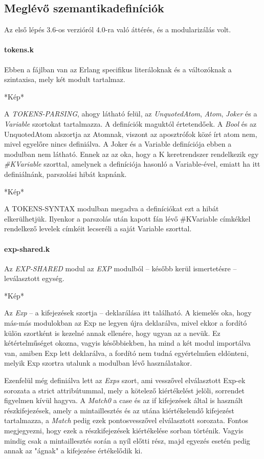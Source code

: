 \documentclass[twoside, a4paper, 12pt]{article}
\begin{document}
\subsection{Meglévő szemantikadefiníciók}
Az első lépés 3.6-os verzióról 4.0-ra való áttérés, és a modularizálás volt.

\paragraph{tokens.k}
Ebben a fájlban van az Erlang specifikus literáloknak és a változóknak a szintaxisa, mely két modult tartalmaz.

*Kép*

A \textit{TOKENS-PARSING}, ahogy látható felül, az \textit{UnquotedAtom}, \textit{Atom}, \textit{Joker} és a \textit{Variable} szortokat tartalmazza. A definíciók maguktól értetendőek. A \textit{Bool} és az UnquotedAtom alszortja az Atomnak, viszont az aposztrófok közé írt atom nem, mivel egyelőre nincs definiálva. A Joker és a Variable definíciója ebben a modulban nem látható. Ennek az az oka, hogy a K keretrendszer rendelkezik egy \textit{\#KVariable} szorttal, amelynek a definíciója hasonló a Variable-ével, emiatt ha itt definiálnánk, parszolási hibát kapnánk.

*Kép*

A TOKENS-SYNTAX modulban megadva a definíciókat ezt a hibát elkerülhetjük. Ilyenkor a parszolás után kapott fán lévő \#KVariable címkékkel rendelkező levelek címkéit lecseréli a saját Variable szorttal.

\paragraph{exp-shared.k}
Az \textit{EXP-SHARED} modul az \textit{EXP} modulból -- később kerül ismertetésre -- leválasztott egység.

*Kép*

Az \textit{Exp} -- a kifejezések szortja -- deklarálása itt található. A kiemelés oka, hogy más-más modulokban az Exp ne legyen újra deklarálva, mivel ekkor a fordító külön szortként is kezelné annak ellenére, hogy ugyan az a nevük. Ez kétértelműséget okozna, vagyis későbbiekben, ha mind a két modul importálva van, amiben Exp lett deklarálva, a fordító nem tudná egyértelműen eldönteni, melyik Exp szortra utalunk a modulban lévő használatakor.

Ezenfelül még definiálva lett az \textit{Exps} szort, ami vesszővel elválasztott Exp-ek sorozata a strict attribútummal, mely a kötelező kiértékelést jelöli, sorrendet figyelmen kívül hagyva. A \textit{Match0} a case és az if kifejezések által is használt részkifejezések, amely a mintaillesztés és az utána kiértékelendő kifejezést tartalmazza, a \textit{Match} pedig ezek pontosvesszővel elválasztott sorozata. Fontos megjegyezni, hogy ezek a részkifejezések kiértékelése sorban történik. Vagyis mindig csak a mintaillesztés során a nyíl előtti rész, majd egyezés esetén pedig annak az "ágnak" a kifejezése értékelődik ki.
\end{document}
